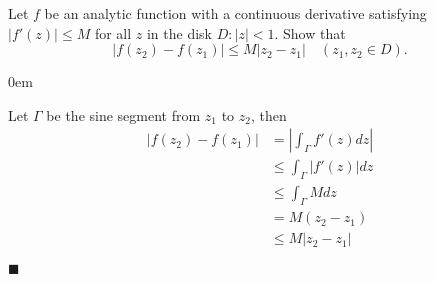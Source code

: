 \documentclass[12pt]{article}
\renewcommand{\qed}{\hfill$\blacksquare$}
\renewenvironment{proof}{\vspace{1em}\begin{addmargin}[2em]{0em}\begin{newproof}}{\end{newproof}\end{addmargin}\qed}
\newenvironment{exercise}[2][Exercise]{\begin{trivlist}
\item[\hskip \labelsep {\bfseries #1} \hskip \labelsep {\bfseries #2.}]}{\end{trivlist}}
\begin{document}
\begin{center}
\end{center}
\begin{exercise}{12}
	Let $f$ be an analytic function with a continuous derivative satisfying $|f'(z)| \le M$ for all $z$ in the disk $D: |z| <1$. Show that
	\[
		|f(z_2) - f(z_1)| \le M|z_2 - z_1| \quad (z_1,z_2 \in D).
	\]
\end{exercise}	
\begin{proof}
	Let $\Gamma$ be the sine segment from $z_1$ to $z_2$, then
	\begin{align*}
		|f(z_2) - f(z_1)| &= \left|\int_{\Gamma} f'(z) dz \right| \\
				  &\le \int_{\Gamma} |f'(z)| dz \\
				  &\le  \int_{\Gamma} M dz \\
				  &= M(z_2 - z_1) \\
				  &\le M|z_2 - z_1|
	\end{align*}
\end{proof}
\end{document}
